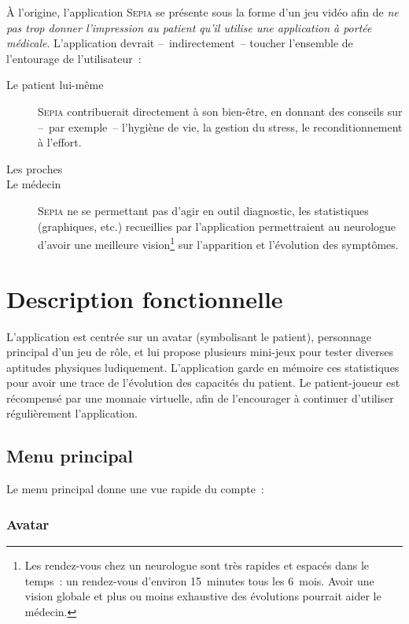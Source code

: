 \documentclass[a4paper,12pt,francais]{article}
\newcommand{\Sepia}{\textsc{Sepia}\xspace}
\begin{document}
À l’origine, l’application \Sepia{} se présente sous la forme d’un jeu vidéo afin de \emph{ne pas trop donner l’impression au patient qu’il utilise une application à portée médicale}. L’application devrait –~indirectement~– toucher l’ensemble de l’entourage de l’utilisateur~:
\begin{description}
    \item[Le patient lui-même] \Sepia{} contribuerait directement à son bien-être, en donnant des conseils sur –~par exemple~– l’hygiène de vie, la gestion du stress, le reconditionnement à l’effort.
    \item[Les proches] %
    \item[Le médecin] \Sepia{} ne se permettant pas d’agir en outil diagnostic, les statistiques (graphiques, etc.) recueillies par l’application permettraient au neurologue d’avoir une meilleure vision\footnote{Les rendez-vous chez un neurologue sont très rapides et espacés dans le temps~: un rendez-vous d’environ 15~minutes tous les 6~mois. Avoir une vision globale et plus ou moins exhaustive des évolutions pourrait aider le médecin.} sur l’apparition et l’évolution des symptômes.
\end{description}

\section{Description fonctionnelle}

L'application est centrée sur un avatar (symbolisant le patient), personnage principal d'un jeu de rôle, et lui propose plusieurs mini-jeux pour tester diverses aptitudes physiques ludiquement. L'application garde en mémoire ces statistiques pour avoir une trace de l'évolution des capacités du patient. Le patient-joueur est récompensé par une monnaie virtuelle, afin de l'encourager à continuer d'utiliser régulièrement l'application.

\subsection{Menu principal}

Le menu principal donne une vue rapide du compte~:

\subsubsection{Avatar}
\end{document}
